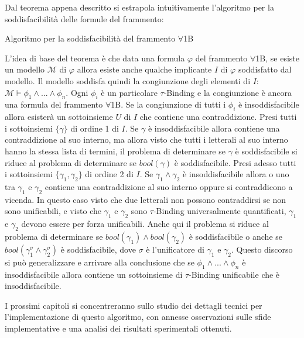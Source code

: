 \documentclass[./main.tex]{subfiles}
\begin{document}
Dal teorema appena descritto si estrapola intuitivamente l'algoritmo per la soddisfacibilità delle formule del frammento:

\begin{algorithm}[H]
    \caption{Algoritmo per la soddisfacibilità del frammento $\forall$1B} \label{alg:1b}
  

    \Return{$\bot$}
  \end{algorithm}

L'idea di base del teorema è che data una formula $\varphi$ del frammento $\forall$1B,
se esiste un modello $\mathcal{M}$ di $\varphi$ allora esiste anche qualche implicante $I$ di $\varphi$ soddisfatto dal modello.
Il modello soddisfa quindi la congiunzione degli elementi di $I$: $\mathcal{M} \models \phi_1 \land ... \land \phi_n$.
Ogni $\phi_i$ è un particolare $\tau$-Binding e la congiunzione è ancora una formula del frammento $\forall$1B. 
Se la congiunzione di tutti i $\phi_i$ è insoddisfacibile allora 
esisterà un sottoinsieme $U$ di $I$ che contiene una contraddizione.
Presi tutti i sottoinsiemi $\{\gamma\}$ di ordine 1 di $I$. 
Se $\gamma$ è insoddisfacibile allora contiene una contraddizione al suo interno, ma allora visto che tutti i letterali
al suo interno hanno la stessa lista di termini, il problema di determinare se $\gamma$ è soddisfacibile si riduce al problema
di determinare se $bool(\gamma)$ è soddisfacibile.
Presi adesso tutti i sottoinsiemi $\{\gamma_1, \gamma_2\}$ di ordine 2 di $I$.
Se $\gamma_1 \land \gamma_2$ è insoddisfacibile allora o uno tra $\gamma_1$ e $\gamma_2$ contiene una contraddizione al suo interno oppure 
si contraddicono a vicenda. 
In questo caso visto che due letterali non possono contraddirsi se non sono unificabili, 
e visto che $\gamma_1$ e $\gamma_2$ sono $\tau$-Binding universalmente quantificati, $\gamma_1$ e $\gamma_2$ devono essere per forza unificabili.
Anche qui il problema si riduce al problema di determinare se $bool(\gamma_1) \land bool(\gamma_2)$ è soddisfacibile 
o anche se $bool(\gamma_1^\sigma \land \gamma_2^\sigma)$ è soddisfacibile, dove $\sigma$ è l'unificatore di $\gamma_1$ e $\gamma_2$.
Questo discorso si può generalizzare e arrivare alla conclusione che se $\phi_1 \land ... \land \phi_n$ è insoddisfacibile allora
contiene un sottoinsieme di $\tau$-Binding unificabile che è insoddisfacibile.

I prossimi capitoli si concentreranno sullo studio dei dettagli tecnici per l'implementazione di questo algoritmo,
con annesse osservazioni sulle sfide implementative e una analisi dei risultati sperimentali ottenuti.
\end{document}
